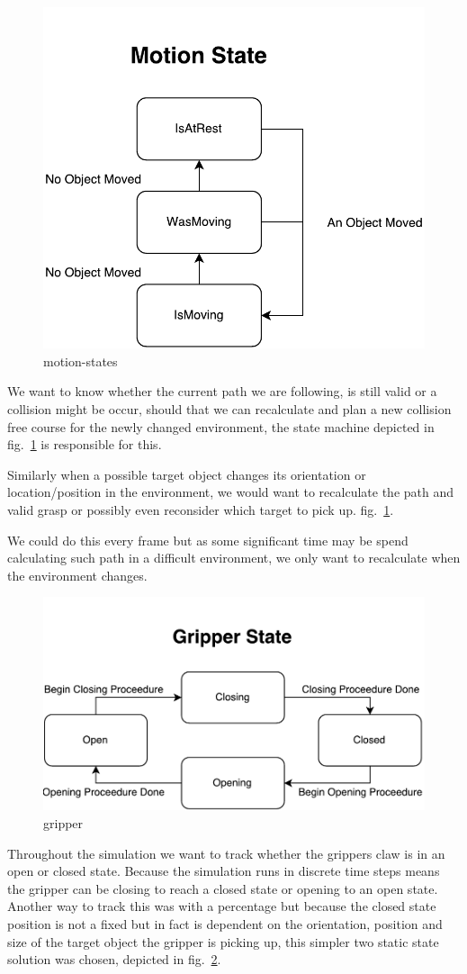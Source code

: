 \begin{figure}
\centering
\includegraphics[width=.6\linewidth]{figures/statediagrams/motion-states.pdf}
\caption{motion-states}
\label{fig:motion-states}
\end{figure}

We want to know whether the current path we are following, is still valid or a collision might be occur, should that we can recalculate and plan a new collision free course for the newly changed environment, the state machine depicted in fig.~\ref{fig:motion-states} is responsible for this.

Similarly when a possible target object changes its orientation or location/position in the environment, we would want to recalculate the path and valid grasp or possibly even reconsider which target to pick up. fig.~\ref{fig:motion-states}.

We could do this every frame but as some significant time may be spend calculating such path in a difficult environment, we only want to recalculate when the environment changes.

\begin{figure}
\centering
\includegraphics[width=.6\linewidth]{figures/statediagrams/gripper.pdf}
\caption{gripper}
\label{fig:gripper}
\end{figure}

Throughout the simulation we want to track whether the grippers claw is in an open or closed state. Because the simulation runs in discrete time steps means the gripper can be closing to reach a closed state or opening to an open state. Another way to track this was with a percentage but because the closed state position is not a fixed but in fact is dependent on the orientation, position and size of the target object the gripper is picking up, this simpler two static state solution was chosen, depicted in fig.~\ref{fig:gripper}.


